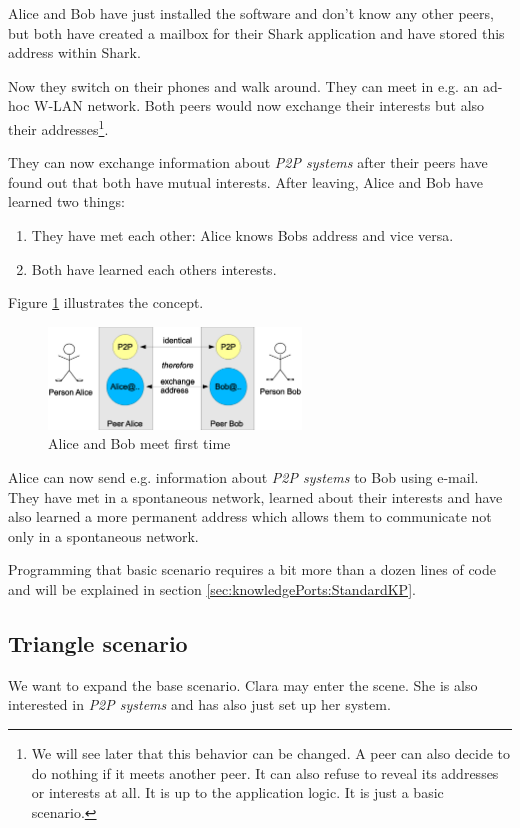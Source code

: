Alice and Bob have just installed the software and don't know any other peers, but both have created a mailbox for their Shark application and have stored this address within Shark.

Now they switch on their phones and walk around. They can meet in e.g. an ad-hoc W-LAN network. Both peers would now exchange their interests but also their addresses\footnote{We will see later that this behavior can be changed. A peer can also decide to do nothing if it meets another peer. It can also refuse to reveal its addresses or interests at all. It is up to the application logic. It is just a basic scenario.}.

They can now exchange information about {\it P2P systems} after their peers have found out that both have mutual interests. After leaving, Alice and Bob have learned two things:

\begin{enumerate}
    \item They have met each other: Alice knows Bobs address and vice versa.
    \item Both have learned each others interests.
\end{enumerate}

Figure \ref{fig:basisscenario} illustrates the concept.

\begin{figure}[t]
\centering
\includegraphics[width=0.60\textwidth]{basisscenario.eps}
\caption{Alice and Bob meet first time}
\label{fig:basisscenario}
\end{figure}

Alice can now send e.g. information about {\it P2P systems} to Bob using e-mail.
They have met in a spontaneous network, learned about their interests and have also learned a more permanent address which allows them to communicate not only in a spontaneous network.

Programming that basic scenario requires a bit more than a dozen lines of code and will be explained in section \ref{sec:knowledgePorts:StandardKP}.

\subsection{Triangle scenario}
We want to expand the base scenario. Clara may enter the scene. She is also interested in {\it P2P systems} and has also just set up her system.

